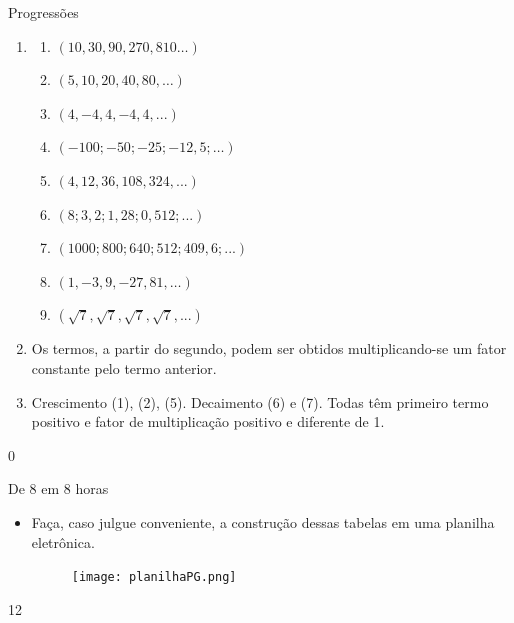 \begin{answer}{Progressões}
{
\begin{enumerate}

\item 
\begin{enumerate}
\item $(10, 30, 90, 270, 810…)$

\item  $(5, 10, 20, 40, 80, …)$

\item  $(4, -4, 4, -4, 4,...)$

\item  $(-100; -50; -25; -12,5; …)$

\item  $(4,12,36,108, 324,...)$

\item  $(8; 3,2; 1,28; 0,512;...)$

\item  $(1000; 800; 640; 512; 409,6;...)$

\item  $(1, -3, 9, -27, 81, …)$

\item  $(\sqrt 7, \sqrt 7, \sqrt 7, \sqrt 7,...)$
\end{enumerate}

\item Os termos, a partir do segundo, podem ser obtidos multiplicando-se um fator constante pelo termo anterior.

\item Crescimento (1), (2), (5). Decaimento (6) e (7). Todas têm primeiro termo positivo e fator de multiplicação positivo e diferente de 1.


\end{enumerate}
}{0}
\end{answer}
\clearmargin
\begin{sugestions}{De 8 em 8 horas}
{
\begin{itemize}
\item Faça, caso julgue conveniente, a construção dessas tabelas em uma planilha eletrônica.

\begin{figure}[H]
\centering
\noindent\texttt{[image: planilhaPG.png]}
\end{figure}
\end{itemize}
}{1}{2}
\end{sugestions}
